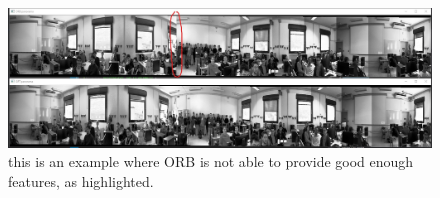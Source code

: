 \documentclass{article}
\begin{document}
\begin{figure}[h]
\begin{center}
\includegraphics[width=1\textwidth]{images/lab_19_automatic}
\caption{\footnotesize{this is an example where ORB is not able to provide good enough features, as highlighted.}}
\label{img_lab_19_automatic}
\end{center}
\end{figure}
\end{document}
